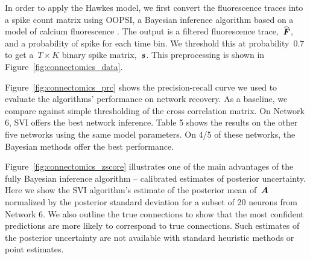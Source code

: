 In order to apply the Hawkes model, we first convert the fluorescence traces into a spike count matrix using OOPSI, a Bayesian inference algorithm based on a model of calcium fluorescence \cite{Vogelstein-2010}.
The output is a filtered fluorescence trace,~$\widehat{\boldsymbol{F}}$, and a probability of spike for each time bin.
We threshold this at probability~$0.7$ to get a~$T\times K$ binary spike matrix,~$\boldsymbol{s}$.
This preprocessing is shown in Figure~\ref{fig:connectomics_data}.

Figure~\ref{fig:connectomics_prc} shows the precision-recall curve we used to evaluate the algorithms' performance on network recovery. As a baseline, we compare against simple thresholding of the cross correlation matrix. On Network 6, SVI offers the best network inference. Table 5 shows the results on the other five networks using the same model parameters. On 4/5 of these networks, the Bayesian methods offer the best performance. 

Figure~\ref{fig:connectomics_zscore} illustrates one of the main advantages of the fully Bayesian inference algorithm -- calibrated estimates of posterior uncertainty. Here we show the SVI algorithm's estimate of the posterior mean of~$\boldsymbol{A}$ normalized by the posterior standard deviation for a subset of 20 neurons from Network 6. We also outline the true connections to show that the most confident predictions are more likely to correspond to true connections. Such estimates of the posterior uncertainty are not available with standard heuristic methods or point estimates.

\begin{table}
  \centering
  \caption[Comparison of inference algorithms on the Chalearn connectomics challenge]{Comparison of inference algorithms on link prediction for five networks from the Chalearn connectomics challenge. Performance is measured by area under the ROC curve and area under the precision recall curve (PRC). In four of the five networks a Hawkes process model provides the best results.}
\end{table}

